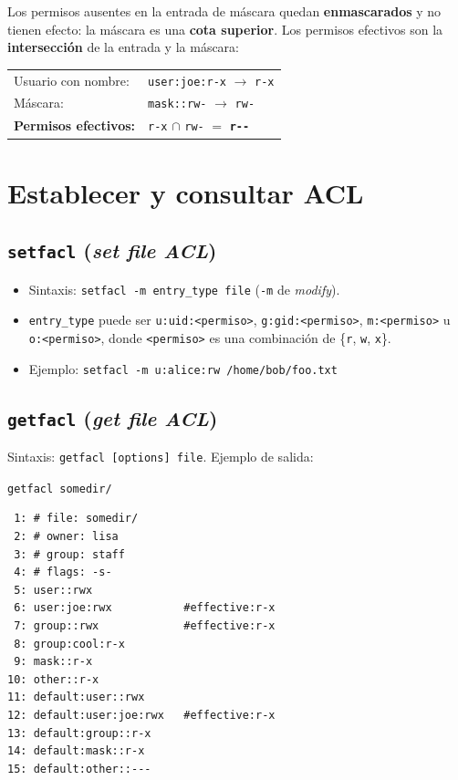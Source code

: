 \documentclass[11pt,a4paper]{report}
\begin{document}
\begin{importante}[title={Enmascaramiento de permisos}]
Los permisos ausentes en la entrada de máscara quedan \textbf{enmascarados} y no tienen efecto: la máscara es una \textbf{cota superior}. Los permisos efectivos son la \textbf{intersección} de la entrada y la máscara:
\begin{center}
\begin{tabular}{l l}
Usuario con nombre: & \texttt{user:joe:r-x} $\to$ \texttt{r-x} \\
Máscara: & \texttt{mask::rw-} $\to$ \texttt{rw-} \\
\midrule
\textbf{Permisos efectivos:} & \texttt{r-x} $\cap$ \texttt{rw-} $=$ \textbf{\texttt{r-{}-}} \\
\end{tabular}
\end{center}
\end{importante}
 
\section{Establecer y consultar ACL}
 
\subsection{\texttt{setfacl} (\emph{set file ACL})}
 
\begin{itemize}
  \item Sintaxis: \texttt{setfacl -m entry\_type file} (\texttt{-m} de \emph{modify}).
  \item \texttt{entry\_type} puede ser \texttt{u:uid:<permiso>}, \texttt{g:gid:<permiso>}, \texttt{m:<permiso>} u \texttt{o:<permiso>}, donde \texttt{<permiso>} es una combinación de \{\texttt{r}, \texttt{w}, \texttt{x}\}.
  \item Ejemplo: \texttt{setfacl -m u:alice:rw /home/bob/foo.txt}
\end{itemize}
 
\subsection{\texttt{getfacl} (\emph{get file ACL})}
 
Sintaxis: \texttt{getfacl [options] file}. Ejemplo de salida:
 
\begin{ejemplo}{\texttt{getfacl somedir/}}
\begin{verbatim}
 1: # file: somedir/
 2: # owner: lisa
 3: # group: staff
 4: # flags: -s-
 5: user::rwx
 6: user:joe:rwx           #effective:r-x
 7: group::rwx             #effective:r-x
 8: group:cool:r-x
 9: mask::r-x
10: other::r-x
11: default:user::rwx
12: default:user:joe:rwx   #effective:r-x
13: default:group::r-x
14: default:mask::r-x
15: default:other::---
\end{verbatim}
\end{ejemplo}
 
\end{document}
